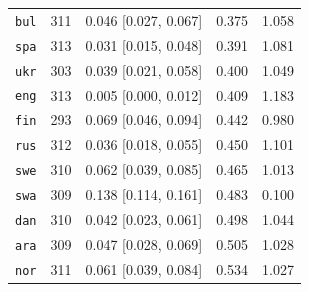 \begin{table}[htbp]
\begin{minipage}[t]{0.485\linewidth}
{\begin{tabular}{@{}lrrrr@{}}
\texttt{bul} & 311 & 0.046 [0.027, 0.067] & 0.375 & 1.058 \\
\texttt{spa} & 313 & 0.031 [0.015, 0.048] & 0.391 & 1.081 \\
\texttt{ukr} & 303 & 0.039 [0.021, 0.058] & 0.400 & 1.049 \\
\texttt{eng} & 313 & 0.005 [0.000, 0.012] & 0.409 & 1.183 \\
\texttt{fin} & 293 & 0.069 [0.046, 0.094] & 0.442 & 0.980 \\
\texttt{rus} & 312 & 0.036 [0.018, 0.055] & 0.450 & 1.101 \\
\texttt{swe} & 310 & 0.062 [0.039, 0.085] & 0.465 & 1.013 \\
\texttt{swa} & 309 & 0.138 [0.114, 0.161] & 0.483 & 0.100 \\
\texttt{dan} & 310 & 0.042 [0.023, 0.061] & 0.498 & 1.044 \\
\texttt{ara} & 309 & 0.047 [0.028, 0.069] & 0.505 & 1.028 \\
\texttt{nor} & 311 & 0.061 [0.039, 0.084] & 0.534 & 1.027 \\
\bottomrule
\end{tabular}}
\end{minipage}
\end{table}

